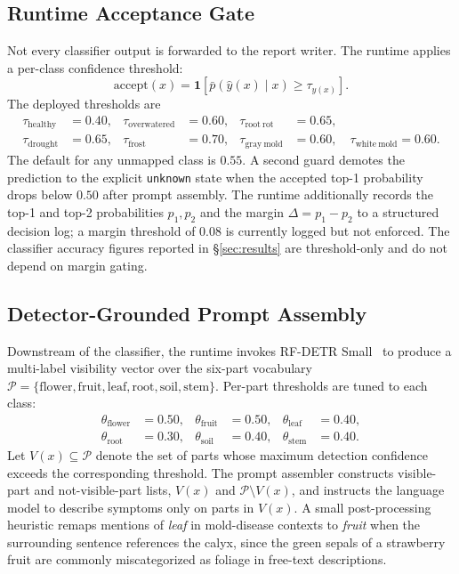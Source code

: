 \subsection{Runtime Acceptance Gate}
\label{sec:gate}

Not every classifier output is forwarded to the report writer. The
runtime applies a per-class confidence threshold:
\begin{equation}
\mathrm{accept}(x)
= \mathbf{1}\!\left[\bar{p}(\hat{y}(x)\mid x) \ge \tau_{\hat{y}(x)}\right].
\label{eq:threshold-gate}
\end{equation}
The deployed thresholds are
\begin{align}
\tau_{\mathrm{healthy}} &= 0.40, &
\tau_{\mathrm{overwatered}} &= 0.60, &
\tau_{\mathrm{root\ rot}} &= 0.65, \nonumber \\
\tau_{\mathrm{drought}} &= 0.65, &
\tau_{\mathrm{frost}} &= 0.70, &
\tau_{\mathrm{gray\ mold}} &= 0.60, \quad
\tau_{\mathrm{white\ mold}} = 0.60.
\label{eq:class-thresholds}
\end{align}
The default for any unmapped class is $0.55$. A second guard demotes the
prediction to the explicit \texttt{unknown} state when the accepted
top-1 probability drops below $0.50$ after prompt assembly. The
runtime additionally records the top-1 and top-2 probabilities $p_1, p_2$
and the margin $\Delta = p_1 - p_2$ to a structured decision log; a
margin threshold of $0.08$ is currently logged but not enforced. The
classifier accuracy figures reported in \S\ref{sec:results} are
threshold-only and do not depend on margin gating.

\subsection{Detector-Grounded Prompt Assembly}

Downstream of the classifier, the runtime invokes RF-DETR
Small~\citep{robinson2025rfdetr,carion2020detr} to produce a
multi-label visibility vector over the six-part vocabulary
$\mathcal{P} = \{\mathrm{flower}, \mathrm{fruit}, \mathrm{leaf},
\mathrm{root}, \mathrm{soil}, \mathrm{stem}\}$. Per-part thresholds are
tuned to each class:
\begin{align*}
\theta_{\mathrm{flower}} &= 0.50, &
\theta_{\mathrm{fruit}} &= 0.50, &
\theta_{\mathrm{leaf}} &= 0.40, \\
\theta_{\mathrm{root}} &= 0.30, &
\theta_{\mathrm{soil}} &= 0.40, &
\theta_{\mathrm{stem}} &= 0.40.
\end{align*}
Let $V(x) \subseteq \mathcal{P}$ denote the set of parts whose maximum
detection confidence exceeds the corresponding threshold. The prompt
assembler constructs visible-part and not-visible-part lists,
$V(x)$ and $\mathcal{P}\setminus V(x)$, and instructs the language model
to describe symptoms only on parts in $V(x)$. A small post-processing
heuristic remaps mentions of \emph{leaf} in mold-disease contexts to
\emph{fruit} when the surrounding sentence references the calyx, since
the green sepals of a strawberry fruit are commonly miscategorized as
foliage in free-text descriptions.


